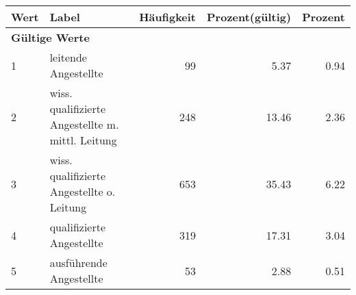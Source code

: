      \begin{longtable}{lXrrr}
     \toprule
     \textbf{Wert} & \textbf{Label} & \textbf{Häufigkeit} & \textbf{Prozent(gültig)} & \textbf{Prozent} \\
     \endhead
     \midrule
     \multicolumn{5}{l}{\textbf{Gültige Werte}}\\

     1 &
     \multicolumn{1}{X}{ leitende Angestellte   } &


       \num{99} &
       \num[round-mode=places,round-precision=2]{5,37} &
         \num[round-mode=places,round-precision=2]{0,94} \\

     2 &
     \multicolumn{1}{X}{ wiss. qualifizierte Angestellte m. mittl. Leitung   } &


       \num{248} &
       \num[round-mode=places,round-precision=2]{13,46} &
         \num[round-mode=places,round-precision=2]{2,36} \\

     3 &
     \multicolumn{1}{X}{ wiss. qualifizierte Angestellte o. Leitung   } &


       \num{653} &
       \num[round-mode=places,round-precision=2]{35,43} &
         \num[round-mode=places,round-precision=2]{6,22} \\

     4 &
     \multicolumn{1}{X}{ qualifizierte Angestellte   } &


       \num{319} &
       \num[round-mode=places,round-precision=2]{17,31} &
         \num[round-mode=places,round-precision=2]{3,04} \\

     5 &
     \multicolumn{1}{X}{ ausführende Angestellte   } &


       \num{53} &
       \num[round-mode=places,round-precision=2]{2,88} &
         \num[round-mode=places,round-precision=2]{0,51} \\


\end{longtable}
